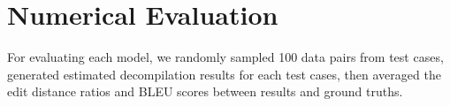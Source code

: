\documentclass[senior,final,11pt]{iscs-thesis}
\begin{document}







\section{Numerical Evaluation}
For evaluating each model, we randomly sampled 100 data pairs from test cases, generated estimated decompilation results for each test cases,
then averaged the edit distance ratios and BLEU scores between results and ground truths.
\end{document}
